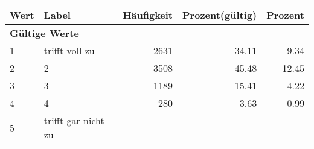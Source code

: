      \begin{longtable}{lXrrr}
     \toprule
     \textbf{Wert} & \textbf{Label} & \textbf{Häufigkeit} & \textbf{Prozent(gültig)} & \textbf{Prozent} \\
     \endhead
     \midrule
     \multicolumn{5}{l}{\textbf{Gültige Werte}}\\

     1 &
     \multicolumn{1}{X}{ trifft voll zu   } &


       \num{2631} &
       \num[round-mode=places,round-precision=2]{34,11} &
         \num[round-mode=places,round-precision=2]{9,34} \\

     2 &
     \multicolumn{1}{X}{ 2   } &


       \num{3508} &
       \num[round-mode=places,round-precision=2]{45,48} &
         \num[round-mode=places,round-precision=2]{12,45} \\

     3 &
     \multicolumn{1}{X}{ 3   } &


       \num{1189} &
       \num[round-mode=places,round-precision=2]{15,41} &
         \num[round-mode=places,round-precision=2]{4,22} \\

     4 &
     \multicolumn{1}{X}{ 4   } &


       \num{280} &
       \num[round-mode=places,round-precision=2]{3,63} &
         \num[round-mode=places,round-precision=2]{0,99} \\

     5 &
     \multicolumn{1}{X}{ trifft gar nicht zu   } &



\end{longtable}
